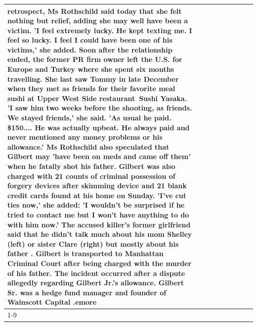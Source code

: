 \begin{table}[H]
\begin{tabular}{lllrlllll}
retrospect, Ms Rothschild said today that she felt nothing but relief, adding she may well have been a victim. 'I feel extremely lucky. He kept texting me. I feel so lucky. I feel I could have been one of his victims,' she added. Soon after the relationship ended, the former PR firm owner left the U.S. for Europe and Turkey where she spent six months  travelling. She last saw Tommy in late December when they met as friends for their favorite meal sushi at Upper West Side restaurant Sushi Yasaka. 'I saw him two weeks before the shooting, as friends. We stayed friends,' she said. 'As usual he paid. \$150.... He was actually upbeat. He always paid and never mentioned any money problems or his allowance.' Ms Rothschild also speculated that Gilbert may 'have been on meds and came off them' when he fatally shot his father. Gilbert was also charged with 21 counts of criminal possession of forgery devices after skimming device and 21 blank credit cards found at his home on Sunday. 'I've cut ties now,' she added: 'I wouldn’t be surprised if he tried to contact me but I won’t have anything to do with him now.' The accused killer's former girlfriend said that he didn't talk much about his mom Shelley (left) or sister Clare (right) but mostly about his father . Gilbert is transported to Manhattan Criminal Court  after being charged with the murder of his father. The incident occurred after a dispute allegedly regarding Gilbert Jr.'s allowance. Gilbert Sr. was a hedge fund manager and founder of Wainscott Capital .emore \\
\cline{1-9}

\end{tabular}
\end{table}
